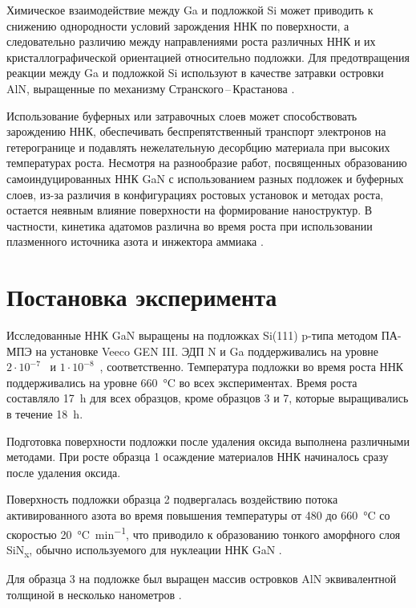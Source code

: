 Химическое взаимодействие между Ga и подложкой Si может приводить к снижению
однородности условий зарождения ННК по поверхности, а следовательно различию
между направлениями роста различных ННК и их кристаллографической ориентацией
относительно подложки. Для предотвращения реакции между Ga и подложкой Si
используют в качестве затравки островки AlN, выращенные по механизму
Странского\,--\,Крастанова \cite{Songmuang2007}.

Использование буферных или затравочных слоев может способствовать зарождению
ННК, обеспечивать беспрепятственный транспорт электронов на гетерогранице и
подавлять нежелательную десорбцию материала при высоких температурах роста.
Несмотря на разнообразие работ, посвященных образованию самоиндуцированных ННК
GaN с использованием разных подложек и буферных слоев, из-за различия в
конфигурациях ростовых установок и методах роста, остается неявным влияние
поверхности на формирование наноструктур. В частности, кинетика адатомов
различна во время роста при использовании плазменного источника азота и
инжектора аммиака \cite{Kawaharazuka2010}.

\section{Постановка эксперимента}\label{sec:ch4/sec1}

Исследованные ННК GaN выращены на подложках Si(111) p-типа методом ПА-МПЭ на
установке Veeco GEN III. ЭДП N и Ga поддерживались на уровне \(2 \cdot
10^{-7}\)~\si{\torr} и \(1 \cdot 10^{-8}\)~\si{\torr}, соответственно.
Температура подложки во время роста ННК поддерживались на уровне
660~\si{\degreeCelsius} во всех экспериментах. Время роста составляло
17~\si{\hour} для всех образцов, кроме образцов 3 и 7, которые выращивались в
течение 18~\si{\hour}.

Подготовка поверхности подложки после удаления оксида выполнена различными
методами. При росте образца 1 осаждение материалов ННК начиналось сразу после
удаления оксида.

Поверхность подложки образца 2 подвергалась воздействию потока активированного
азота во время повышения температуры от 480 до 660~\si{\degreeCelsius} со
скоростью 20~\si{\degreeCelsius\per\minute}, что приводило к образованию
тонкого аморфного слоя SiN\textsubscript{x}, обычно используемого для нуклеации
ННК GaN \cite{Wierzbicka2013}.

Для образца 3 на подложке был выращен массив островков AlN эквивалентной
толщиной в несколько нанометров \cite{Bolshakov2018}.

